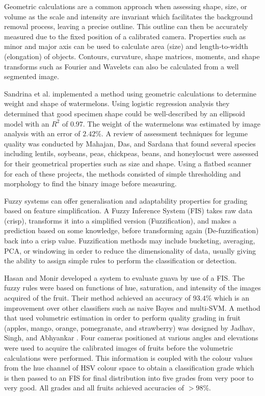 \documentclass[fleqn,twoside,12pt]{report}
\begin{document}
Geometric calculations are a common approach when assessing shape, size, or volume as the scale and intensity are invariant which facilitates the background removal process, leaving a precise outline. This outline can then be accurately measured due to the fixed position of a calibrated camera. Properties such as minor and major axis can be used to calculate area (size) and length-to-width (elongation) of objects. Contours, curvature, shape matrices, moments, and shape transforms such as Fourier and Wavelets can also be calculated from a well segmented image. 

Sandrina et al.\cite{sandrina} implemented a method using geometric calculations to determine weight and shape of watermelons. Using logistic regression analysis they determined that good specimen shape could be well-described by an ellipsoid model with an $R^2$ of $0.97$. The weight of the watermelons was estimated by image analysis with an error of $2.42\%$. A review of assessment techniques for legume quality was conducted by Mahajan, Das, and Sardana \cite{mahajan} that found several species including lentils, soybeans, peas, chickpeas, beans, and honeylocust were assessed for their geometrical properties such as size and shape. Using a flatbed scanner for each of these projects, the methods consisted of simple thresholding and morphology to find the binary image before measuring. 


Fuzzy systems can offer generalisation and adaptability properties for grading based on feature simplification. A Fuzzy Inference System (FIS) takes raw data (crisp), transforms it into a simplified version (Fuzzification), and makes a prediction based on some knowledge, before transforming again (De-fuzzification) back into a crisp value. Fuzzification methods may include bucketing, averaging, PCA, or windowing in order to reduce the dimensionality of data, usually giving the ability to assign simple rules to perform the classification or detection.

Hasan and Monir \cite{hasan} developed a system to evaluate guava by use of a FIS. The fuzzy rules were based on functions of hue, saturation, and intensity of the images acquired of the fruit. Their method achieved an accuracy of $93.4\%$ which is an improvement over other classifiers such as naive Bayes and multi-SVM. A method that used volumetric estimation in order to perform quality grading in fruit (apples, mango, orange, pomegranate, and strawberry) was designed by Jadhav, Singh, and Abhyankar \cite{jadhav}. Four cameras positioned at various angles and elevations were used to acquire the calibrated images of fruits before the volumetric calculations were performed. This information is coupled with the colour values from the hue channel of HSV colour space to obtain a classification grade which is then passed to an FIS for final distribution into five grades from very poor to very good. All grades and all fruits achieved accuracies of $>98\%$. 
\end{document}
